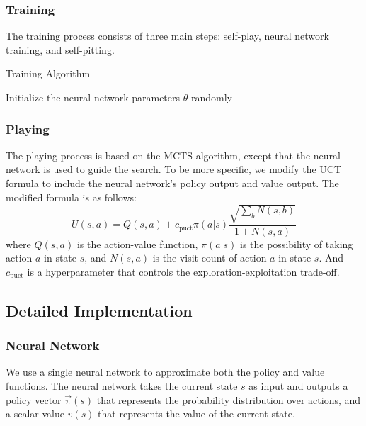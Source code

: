 \documentclass[conference]{IEEEtran}
\begin{document}
\subsubsection{Training}

The training process consists of three main steps: self-play, neural network training, and self-pitting.
\begin{algorithm}
    \caption{Training Algorithm}
    \SetAlgoLined
    Initialize the neural network parameters $\theta$ randomly\;
\end{algorithm}

\subsubsection{Playing}

The playing process is based on the MCTS algorithm, except that the neural network is used to guide the search.
To be more specific, we modify the UCT formula to include the neural network's policy output and value output.
The modified formula is as follows:
\begin{equation}
    U(s, a) = Q(s, a) + c_{\text{puct}} \pi(a|s) \frac{\sqrt{\sum_b N(s, b)}}{1 + N(s, a)}
\end{equation}
where $Q(s, a)$ is the action-value function, $\pi(a|s)$ is the possibility of taking action $a$ in state $s$, and $N(s, a)$ is the visit count of action $a$ in state $s$.
And $c_{\text{puct}}$ is a hyperparameter that controls the exploration-exploitation trade-off.

\subsection{Detailed Implementation}

\subsubsection{Neural Network}

We use a single neural network to approximate both the policy and value functions.
The neural network takes the current state $s$ as input and outputs a policy vector $\vec{\pi}(s)$ that represents the probability distribution over actions, and a scalar value $v(s)$ that represents the value of the current state.
\end{document}
